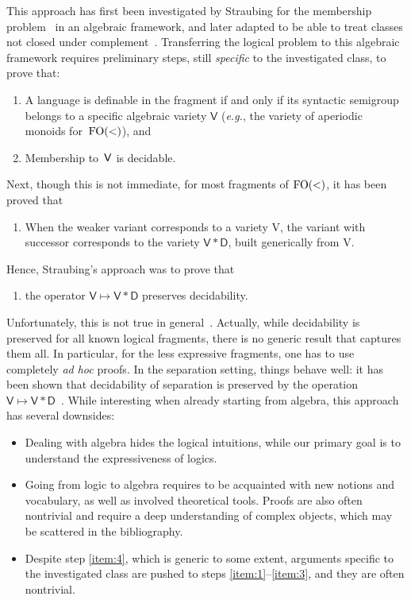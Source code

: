 \documentclass[a4paper,USenglish]{lipics}
\newcommand{\fow}{\ensuremath{\textup{FO}(<)}\xspace}
\theoremstyle{plain}
\begin{document}
This approach has first been investigated by Straubing for the membership
problem~\cite{Str85} in an algebraic framework, and later adapted to be able
to treat classes not closed under complement~\cite{pw:wreath}. Transferring the logical
problem to this algebraic framework requires preliminary steps,
still \emph{specific} to the investigated class, to prove that:
\begin{enumerate}
\item\label{item:1} A language is definable in the fragment if and only if its syntactic semigroup
  belongs to a specific algebraic variety $\mathsf{V}$ (\emph{e.g.}, the
  variety of aperiodic monoids for~\fow), and
\item\label{item:2} Membership to~$\sf V$ is decidable.
\end{enumerate}
Next, though this is not immediate, for most fragments of \fow, it has been
proved that \begin{enumerate}[resume]
\item\label{item:3} When the weaker variant corresponds to a variety {\sf V}, the variant
  with successor corresponds to the variety $\mathsf{V} \ast \mathsf{D}$,
  built generically from {\sf V}.
\end{enumerate}
Hence, Straubing's approach was to prove that
\begin{enumerate}[resume]
\item\label{item:4} the operator $\mathsf{V} \mapsto \mathsf{V}\ast\mathsf{D}$
  preserves decidability.
\end{enumerate}
Unfortunately, this is not true in
general~\cite{DBLP:journals/ijac/Auinger10}. Actually, while
decidability is preserved for all known logical fragments, there is no
generic result that captures them all. In particular, for the less
expressive fragments, one has to use completely \emph{ad hoc} proofs.
In the separation setting, things behave well: it
has been shown that decidability of separation is preserved by the operation $\mathsf{V}
\mapsto \mathsf{V} \ast \mathsf{D}$~\cite{Steinberg:delay-pointlikes:2001}.
While interesting when already starting from algebra, this approach has several downsides:
\begin{itemize}
\item Dealing with algebra hides the logical intuitions, while our primary
  goal is to understand the expressiveness of logics.
\item Going from logic to algebra requires to be acquainted with new notions
  and vocabulary, as well as involved theoretical tools. Proofs are also
  often nontrivial and require a deep understanding of complex objects, which
  may be scattered in the bibliography.
\item Despite step \ref{item:4}, which is generic to some extent, arguments
  specific to the investigated class are pushed to steps
  \ref{item:1}--\ref{item:3}, and they are often nontrivial.
\end{itemize}
\end{document}
